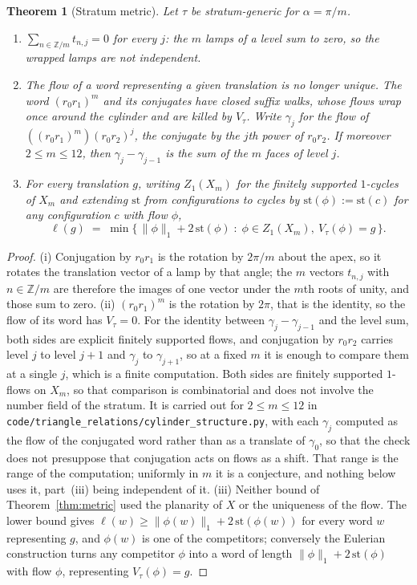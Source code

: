 \documentclass[11pt]{article}
\newtheorem{theorem}{Theorem}[section]
\theoremstyle{definition}
\theoremstyle{remark}
\newcommand{\Z}{\mathbb{Z}}
\begin{document}
\begin{theorem}[Stratum metric]\label{thm:cyl}
Let $\tau$ be stratum-generic for $\alpha=\pi/m$.
\begin{enumerate}
\item[(i)] $\sum_{n\in\Z/m}t_{n,j}=0$ for every $j$: the $m$ lamps of a level
sum to zero, so the wrapped lamps are not independent.
\item[(ii)] The flow of a word representing a given translation is no longer
unique. The word $(r_0r_1)^m$ and its conjugates have closed suffix walks,
whose flows wrap once around the cylinder and are killed by $V_\tau$. Write
$\gamma_j$ for the flow of $(\!(r_0r_1)^m\!)(r_0r_2)^j$, the conjugate by the
$j$th power of $r_0r_2$. If moreover $2\le m\le12$, then
$\gamma_j-\gamma_{j-1}$ is the sum of the $m$ faces of level $j$.
\item[(iii)] For every translation $g$, writing $Z_1(X_m)$ for the finitely
supported $1$-cycles of $X_m$ and extending $\mathrm{st}$ from configurations to
cycles by $\mathrm{st}(\phi):=\mathrm{st}(c)$ for any configuration $c$ with
flow $\phi$,
\[
 \ell(g)\;=\;\min\bigl\{\,\|\phi\|_1+2\,\mathrm{st}(\phi)\;:\;\phi\in Z_1(X_m),\
 V_\tau(\phi)=g\,\bigr\}.
\]
\end{enumerate}
\end{theorem}

\begin{proof}
(i) Conjugation by $r_0r_1$ is the rotation by $2\pi/m$ about the apex, so it
rotates the translation vector of a lamp by that angle; the $m$ vectors
$t_{n,j}$ with $n\in\Z/m$ are therefore the images of one vector under the
$m$th roots of unity, and those sum to zero. (ii) $(r_0r_1)^m$ is the rotation
by $2\pi$, that is the identity, so the flow of its word has $V_\tau=0$. For the
identity between $\gamma_j-\gamma_{j-1}$ and the level sum, both sides are
explicit finitely supported flows, and conjugation by $r_0r_2$ carries level $j$
to level $j+1$ and $\gamma_j$ to $\gamma_{j+1}$, so at a fixed $m$ it is enough
to compare them at a single $j$, which is a finite computation. Both sides are
finitely supported $1$-flows on $X_m$, so that comparison is combinatorial and
does not involve the number field of the stratum. It is carried
out for $2\le m\le12$ in \texttt{code/triangle\_relations/cylinder\_structure.py},
with each $\gamma_j$ computed as the flow of the conjugated word rather than as
a translate of $\gamma_0$, so that the check does not presuppose that
conjugation acts on flows as a shift. That range is the range of the
computation; uniformly in $m$ it is a
conjecture, and nothing below uses it, part~(iii) being independent of it.
(iii) Neither bound of Theorem~\ref{thm:metric} used the planarity of $X$ or
the uniqueness of the flow. The lower bound gives
$\ell(w)\ge\|\phi(w)\|_1+2\,\mathrm{st}(\phi(w))$ for every word $w$
representing $g$, and $\phi(w)$ is one of the competitors; conversely the
Eulerian construction turns any competitor $\phi$ into a word of length
$\|\phi\|_1+2\,\mathrm{st}(\phi)$ with flow $\phi$, representing
$V_\tau(\phi)=g$.
\end{proof}
\end{document}
